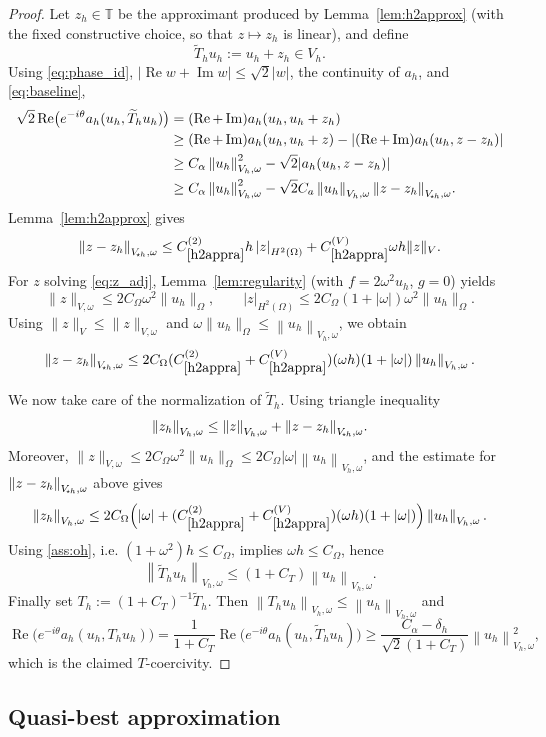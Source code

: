 \documentclass[11pt]{article}
\theoremstyle{definition}
\theoremstyle{plain}
\newcommand{\Ca}{C_a}
\newcommand{\const}[1]{C_{\eqref{#1}}}
\newcommand{\Vsh}{V_{\!\star \hspace*{-0.2mm}h}}
\newcommand{\dgonorm}[1]{\norm{#1}_{V_h,\omega}}
\newcommand{\tdgonorm}[1]{{\Vert#1\Vert}_{\Vsh,\omega}}
\newcommand{\dom}{\Omega}
\renewcommand{\Re}{\operatorname{Re}}
\renewcommand{\Im}{\operatorname{Im}}
\newcommand*{\snorm}[1]{\left|#1\right|}
\newcommand*{\norm}[1]{\left\|#1\right\|}
\newcommand{\ITh}{\mathbb{T}}
\begin{document}
\begin{proof}
Let $z_h\in\ITh$ be the approximant produced by Lemma~\ref{lem:h2approx} (with the fixed constructive choice,
so that $z\mapsto z_h$ is linear), and define
\[
\widetilde T_hu_h:=u_h+z_h \in V_h .
\]
Using \eqref{eq:phase_id}, $|\Re w+\Im w|\le \sqrt2 |w|$, the continuity of $a_h$, and \eqref{eq:baseline},
\begin{align*}
\sqrt2 \Re\bigl(e^{-i\theta}a_h(u_h,\widetilde T_hu_h)\bigr)
&=(\Re+\Im)a_h(u_h,u_h+z_h)
\\
&\ge (\Re+\Im)a_h(u_h,u_h+z)-|(\Re+\Im)a_h(u_h,z-z_h)|
\\
&\ge C_\alpha \dgonorm{u_h}^2-\sqrt2 |a_h(u_h,z-z_h)|
\\
&\ge C_\alpha \dgonorm{u_h}^2-\sqrt2 \Ca \dgonorm{u_h} \tdgonorm{z-z_h}.
\end{align*}
Lemma~\ref{lem:h2approx} gives
\[
\tdgonorm{z-z_h}
\le \const{h2appra}^{(2)} h \snorm{z}_{H^2(\Omega)}
     +\const{h2appra}^{(V)} \omega h \|z\|_{V}.
\]
For $z$ solving \eqref{eq:z_adj}, Lemma~\ref{lem:regularity} (with $f=2\omega^2u_h$, $g=0$) yields
\[
\|z\|_{V,\omega}\le 2C_\dom \omega^2\|u_h\|_\Omega,
\qquad
\snorm{z}_{H^2(\Omega)}\le 2C_\dom(1+|\omega|) \omega^2\|u_h\|_\Omega.
\]
Using $\|z\|_{V}\le \|z\|_{V,\omega}$ and $\omega\|u_h\|_\Omega\le \dgonorm{u_h}$, we obtain
\[
\tdgonorm{z-z_h}
\le 2C_\dom (\const{h2appra}^{(2)}+\const{h2appra}^{(V)})(\omega h)(1+|\omega|) \dgonorm{u_h}.
\]

We now take care of the normalization of $\widetilde T_h$.
Using triangle inequality 
\[
\dgonorm{z_h}\le \dgonorm{z}+\tdgonorm{z-z_h}.
\]
Moreover, $\|z\|_{V,\omega}\le 2C_\dom \omega^2\|u_h\|_\Omega\le 2C_\dom|\omega| \dgonorm{u_h}$,
and the estimate for $\tdgonorm{z-z_h}$ above gives
\[
\dgonorm{z_h}\le 2C_\dom\Bigl(|\omega|+(\const{h2appra}^{(2)}+\const{h2appra}^{(V)})(\omega h)(1+|\omega|)\Bigr)\dgonorm{u_h}.
\]
Using \eqref{ass:oh}, i.e. $(1+\omega^2)h\le C_\Omega$, implies $\omega h\le C_\Omega$, hence
\[
\dgonorm{\widetilde T_hu_h}\le(1+C_T)\dgonorm{u_h}.
\]
Finally set $T_h:=(1+C_T)^{-1}\widetilde T_h$. Then $\dgonorm{T_hu_h}\le\dgonorm{u_h}$ and
\[
\Re \bigl(e^{-i\theta}a_h(u_h,T_hu_h)\bigr)
=\frac{1}{1+C_T}\Re \bigl(e^{-i\theta}a_h(u_h,\widetilde T_hu_h)\bigr)
\ge \frac{C_\alpha-\delta_h}{\sqrt2(1+C_T)}\dgonorm{u_h}^2,
\]
which is the claimed $T$-coercivity.
\end{proof}






\subsection{Quasi-best approximation}\label{sec:quasi_best}
\end{document}

